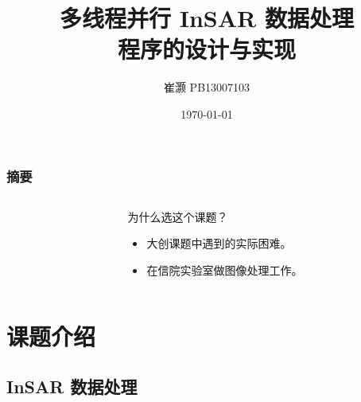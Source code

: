 \documentclass{beamer}
\title{多线程并行 InSAR 数据处理\\程序的设计与实现}
\author{崔灏 PB13007103}
\institute{中国科学技术大学\\地球和空间科学学院}
\date{\today}
\begin{document}
\frame{\titlepage}

\begin{frame}
    \frametitle{摘要}
    \begin{columns}
        \begin{column}{0.4\textwidth}
            \tableofcontents
        \end{column}
        \begin{column}{0.6\textwidth}
            为什么选这个课题？
            \begin{itemize}
                \item 大创课题中遇到的实际困难。
                \item 在信院实验室做图像处理工作。
            \end{itemize}
        \end{column}
    \end{columns}
\end{frame}

\section{课题介绍}
\subsection{InSAR 数据处理}
\end{document}

